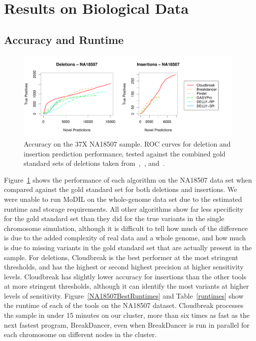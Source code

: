 \section{Results on Biological Data}\label{section_na18507}

\subsection{Accuracy and Runtime}

\begin{figure}
\centering
\includegraphics[width=1\textwidth]{figures/NA18507_COMBINED_ROCS_POSTER.pdf}
\caption[Accuracy on the 37X NA18507 sample.]{Accuracy on the 37X NA18507 sample. ROC curves for deletion and insertion prediction performance, tested against the combined gold standard sets of deletions taken from~\cite{Kidd:2008p926},~\cite{Mills:2011fi}, and~\cite{GenomesProjectConsortium:2012co}.}
\label{NA18507CombinedRoc}
\end{figure}

Figure~\ref{NA18507CombinedRoc} shows the performance of each algorithm on the NA18507 data set when compared against the gold standard set for both deletions and insertions. We were unable to run MoDIL on the whole-genome data set due to the estimated runtime and storage requirements. All other algorithms show far less specificity for the gold standard set than they did for the true variants in the single chromosome simulation, although it is difficult to tell how much of the difference is due to the added complexity of real data and a whole genome, and how much is due to missing variants in the gold standard set that are actually present in the sample. For deletions, Cloudbreak is the best performer at the most stringent thresholds, and has the highest or second highest precision at higher sensitivity levels. Cloudbreak has slightly lower accuracy for insertions than the other tools at more stringent thresholds, although it can identify the most variants at higher levels of sensitivity. Figure~\ref{NA18507BestRuntimes} and Table~\ref{runtimes} show the runtime of each of the tools on the NA18507 dataset. Cloudbreak processes the sample in under 15 minutes on our cluster, more than six times as fast as the next fastest program, BreakDancer, even when BreakDancer is run in parallel for each chromosome on different nodes in the cluster.

